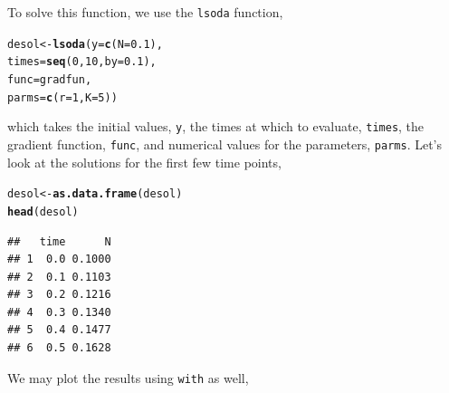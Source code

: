 \documentclass[11pt]{article}\usepackage[]{graphicx}\usepackage[]{color}
\makeatletter
\newcommand{\hlnum}[1]{\textcolor[rgb]{0.686,0.059,0.569}{#1}}%
\newcommand{\hlstd}[1]{\textcolor[rgb]{0.345,0.345,0.345}{#1}}%
\newcommand{\hlkwb}[1]{\textcolor[rgb]{0.69,0.353,0.396}{#1}}%
\newcommand{\hlkwc}[1]{\textcolor[rgb]{0.333,0.667,0.333}{#1}}%
\newcommand{\hlkwd}[1]{\textcolor[rgb]{0.737,0.353,0.396}{\textbf{#1}}}%
\newenvironment{kframe}{%
 \def\at@end@of@kframe{}%
 \ifinner\ifhmode%
  \def\at@end@of@kframe{\end{minipage}}%
  \begin{minipage}{\columnwidth}%
 \fi\fi%
 \def\FrameCommand##1{\hskip\@totalleftmargin \hskip-\fboxsep
 \colorbox{shadecolor}{##1}\hskip-\fboxsep
     \hskip-\linewidth \hskip-\@totalleftmargin \hskip\columnwidth}%
 \MakeFramed {\advance\hsize-\width
   \@totalleftmargin\z@ \linewidth\hsize
   \@setminipage}}%
 {\par\unskip\endMakeFramed%
 \at@end@of@kframe}
\newenvironment{knitrout}{}{} %
\newcommand{\code}[1]{{\tt #1}}
\numberwithin{exercise}{section}
\makeatother
\begin{document}
To solve this function, we use the \code{lsoda} function,
\begin{knitrout}
\color{fgcolor}\begin{kframe}
\begin{alltt}
\hlstd{desol} \hlkwb{<-} \hlkwd{lsoda}\hlstd{(}\hlkwc{y} \hlstd{=} \hlkwd{c}\hlstd{(}\hlkwc{N} \hlstd{=} \hlnum{0.1}\hlstd{),}
               \hlkwc{times} \hlstd{=} \hlkwd{seq}\hlstd{(}\hlnum{0}\hlstd{,} \hlnum{10}\hlstd{,} \hlkwc{by} \hlstd{=} \hlnum{0.1}\hlstd{),}
               \hlkwc{func} \hlstd{= gradfun,}
               \hlkwc{parms} \hlstd{=} \hlkwd{c}\hlstd{(}\hlkwc{r} \hlstd{=} \hlnum{1}\hlstd{,} \hlkwc{K} \hlstd{=} \hlnum{5}\hlstd{))}
\end{alltt}
\end{kframe}
\end{knitrout}
which takes the initial values, \code{y}, the times at which to
evaluate, \code{times}, the gradient function, \code{func}, and
numerical values for the parameters, \code{parms}.  Let's look at the
solutions for the first few time points,
\begin{knitrout}
\color{fgcolor}\begin{kframe}
\begin{alltt}
\hlstd{desol} \hlkwb{<-} \hlkwd{as.data.frame}\hlstd{(desol)}
\hlkwd{head}\hlstd{(desol)}
\end{alltt}
\begin{verbatim}
##   time      N
## 1  0.0 0.1000
## 2  0.1 0.1103
## 3  0.2 0.1216
## 4  0.3 0.1340
## 5  0.4 0.1477
## 6  0.5 0.1628
\end{verbatim}
\end{kframe}
\end{knitrout}
We may plot the results using \code{with} as well,
\end{document}
